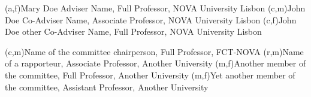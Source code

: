 (a,f){Mary Doe Adviser Name, Full Professor, NOVA University Lisbon}
(c,m){John Doe Co-Adviser Name, Associate Professor, NOVA University Lisbon}
(c,f){John Doe other Co-Adviser Name, Full Professor, NOVA University Lisbon}

(c,m){Name of the committee chairperson, Full Professor, FCT-NOVA}
(r,m){Name of a rapporteur, Associate Professor, Another University}
(m,f){Another member of the committee, Full Professor, Another University}
(m,f){Yet another member of the committee, Assistant Professor, Another University}
